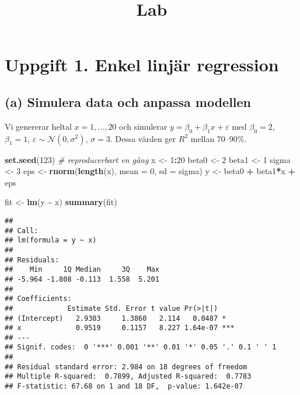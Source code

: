 \documentclass[
  11pt,
]{article}
\title{Lab}
\author{}
\date{\vspace{-2.5em}}
\newenvironment{Shaded}{\begin{snugshade}}{\end{snugshade}}
\newcommand{\AttributeTok}[1]{\textcolor[rgb]{0.13,0.29,0.53}{#1}}
\newcommand{\CommentTok}[1]{\textcolor[rgb]{0.56,0.35,0.01}{\textit{#1}}}
\newcommand{\DecValTok}[1]{\textcolor[rgb]{0.00,0.00,0.81}{#1}}
\newcommand{\FunctionTok}[1]{\textcolor[rgb]{0.13,0.29,0.53}{\textbf{#1}}}
\newcommand{\NormalTok}[1]{#1}
\newcommand{\OtherTok}[1]{\textcolor[rgb]{0.56,0.35,0.01}{#1}}
\newcommand{\SpecialCharTok}[1]{\textcolor[rgb]{0.81,0.36,0.00}{\textbf{#1}}}
\begin{document}
\maketitle

\section{Uppgift 1. Enkel linjär
regression}\label{uppgift-1.-enkel-linjuxe4r-regression}

\subsection{(a) Simulera data och anpassa
modellen}\label{a-simulera-data-och-anpassa-modellen}

Vi genererar heltal \(x=1,\dots,20\) och simulerar
\(y=\beta_0+\beta_1 x+\varepsilon\) med \(\beta_0=2\), \(\beta_1=1\),
\(\varepsilon\sim\mathcal{N}(0,\sigma^2)\), \(\sigma=3\). Dessa värden
ger \(R^2\) mellan 70--90\%.

\begin{Shaded}
\begin{Highlighting}[]
\FunctionTok{set.seed}\NormalTok{(}\DecValTok{123}\NormalTok{)                 }\CommentTok{\# reproducerbart en gång }
\NormalTok{x }\OtherTok{\textless{}{-}} \DecValTok{1}\SpecialCharTok{:}\DecValTok{20}
\NormalTok{beta0 }\OtherTok{\textless{}{-}} \DecValTok{2}
\NormalTok{beta1 }\OtherTok{\textless{}{-}} \DecValTok{1}
\NormalTok{sigma }\OtherTok{\textless{}{-}} \DecValTok{3}
\NormalTok{eps }\OtherTok{\textless{}{-}} \FunctionTok{rnorm}\NormalTok{(}\FunctionTok{length}\NormalTok{(x), }\AttributeTok{mean =} \DecValTok{0}\NormalTok{, }\AttributeTok{sd =}\NormalTok{ sigma)}
\NormalTok{y }\OtherTok{\textless{}{-}}\NormalTok{ beta0 }\SpecialCharTok{+}\NormalTok{ beta1}\SpecialCharTok{*}\NormalTok{x }\SpecialCharTok{+}\NormalTok{ eps}

\NormalTok{fit }\OtherTok{\textless{}{-}} \FunctionTok{lm}\NormalTok{(y }\SpecialCharTok{\textasciitilde{}}\NormalTok{ x)}
\FunctionTok{summary}\NormalTok{(fit)}
\end{Highlighting}
\end{Shaded}

\begin{verbatim}
## 
## Call:
## lm(formula = y ~ x)
## 
## Residuals:
##    Min     1Q Median     3Q    Max 
## -5.964 -1.808 -0.113  1.558  5.201 
## 
## Coefficients:
##             Estimate Std. Error t value Pr(>|t|)    
## (Intercept)   2.9303     1.3860   2.114   0.0487 *  
## x             0.9519     0.1157   8.227 1.64e-07 ***
## ---
## Signif. codes:  0 '***' 0.001 '**' 0.01 '*' 0.05 '.' 0.1 ' ' 1
## 
## Residual standard error: 2.984 on 18 degrees of freedom
## Multiple R-squared:  0.7899, Adjusted R-squared:  0.7783 
## F-statistic: 67.68 on 1 and 18 DF,  p-value: 1.642e-07
\end{verbatim}
\end{document}
